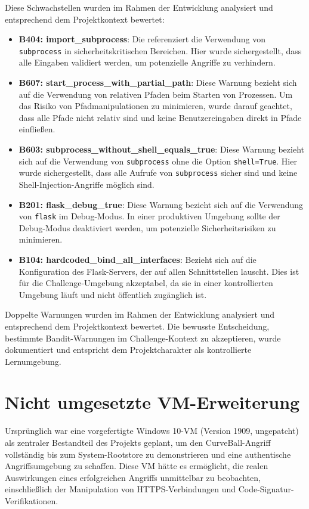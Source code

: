\documentclass{article}
\begin{document}
Diese Schwachstellen wurden im Rahmen der Entwicklung analysiert und entsprechend dem Projektkontext bewertet:

\begin{itemize}
  \item \textbf{B404: import\_subprocess}: Die referenziert die Verwendung von \texttt{subprocess} in sicherheitskritischen Bereichen. Hier wurde sichergestellt, dass alle Eingaben validiert werden, um potenzielle Angriffe zu verhindern.

  \item \textbf{B607: start\_process\_with\_partial\_path}: Diese Warnung bezieht sich auf die Verwendung von relativen Pfaden beim Starten von Prozessen. Um das Risiko von Pfadmanipulationen zu minimieren, wurde darauf geachtet, dass alle Pfade nicht relativ sind und keine Benutzereingaben direkt in Pfade einfließen.

  \item \textbf{B603: subprocess\_without\_shell\_equals\_true}: Diese Warnung bezieht sich auf die Verwendung von \texttt{subprocess} ohne die Option \texttt{shell=True}. Hier wurde sichergestellt, dass alle Aufrufe von \texttt{subprocess} sicher sind und keine Shell-Injection-Angriffe möglich sind.

  \item \textbf{B201: flask\_debug\_true}: Diese Warnung bezieht sich auf die Verwendung von \texttt{flask} im Debug-Modus. In einer produktiven Umgebung sollte der Debug-Modus deaktiviert werden, um potenzielle Sicherheitsrisiken zu minimieren.

  \item \textbf{B104: hardcoded\_bind\_all\_interfaces}: Bezieht sich auf die Konfiguration des Flask-Servers, der auf allen Schnittstellen lauscht. Dies ist für die Challenge-Umgebung akzeptabel, da sie in einer kontrollierten Umgebung läuft und nicht öffentlich zugänglich ist.
\end{itemize}

\noindent
Doppelte Warnungen wurden im Rahmen der Entwicklung analysiert und entsprechend dem Projektkontext bewertet.
\noindent
Die bewusste Entscheidung, bestimmte Bandit-Warnungen im Challenge-Kontext zu akzeptieren, wurde dokumentiert und entspricht dem Projektcharakter als kontrollierte Lernumgebung.
\newpage

\section{Nicht umgesetzte VM-Erweiterung}
Ursprünglich war eine vorgefertigte Windows 10-VM (Version 1909, ungepatcht) als zentraler Bestandteil des Projekts geplant,
um den CurveBall-Angriff vollständig bis zum System-Rootstore zu demonstrieren und eine authentische Angriffsumgebung zu schaffen.
Diese VM hätte es ermöglicht, die realen Auswirkungen eines erfolgreichen Angriffs unmittelbar zu beobachten, einschließlich der
Manipulation von HTTPS-Verbindungen und Code-Signatur-Verifikationen.
\end{document}
